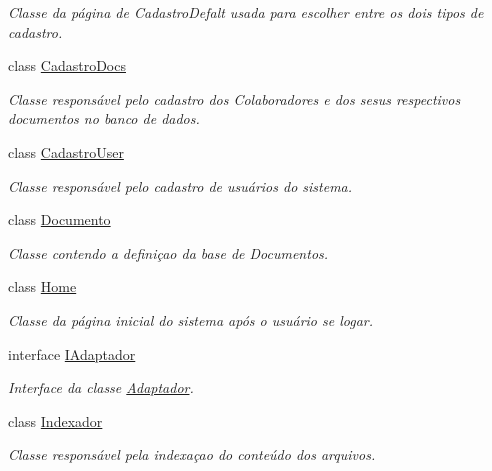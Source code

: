 \begin{DoxyCompactItemize}
\begin{DoxyCompactList}\small\item\em Classe da página de CadastroDefalt usada para escolher entre os dois tipos de cadastro. \item\end{DoxyCompactList}\item 
class \hyperlink{class_sistema_r_h_1_1_cadastro_docs}{CadastroDocs}
\begin{DoxyCompactList}\small\item\em Classe responsável pelo cadastro dos Colaboradores e dos sesus respectivos documentos no banco de dados. \item\end{DoxyCompactList}\item 
class \hyperlink{class_sistema_r_h_1_1_cadastro_user}{CadastroUser}
\begin{DoxyCompactList}\small\item\em Classe responsável pelo cadastro de usuários do sistema. \item\end{DoxyCompactList}\item 
class \hyperlink{class_sistema_r_h_1_1_documento}{Documento}
\begin{DoxyCompactList}\small\item\em Classe contendo a definiçao da base de Documentos. \item\end{DoxyCompactList}\item 
class \hyperlink{class_sistema_r_h_1_1_home}{Home}
\begin{DoxyCompactList}\small\item\em Classe da página inicial do sistema após o usuário se logar. \item\end{DoxyCompactList}\item 
interface \hyperlink{interface_sistema_r_h_1_1_i_adaptador}{IAdaptador}
\begin{DoxyCompactList}\small\item\em Interface da classe \hyperlink{class_sistema_r_h_1_1_adaptador}{Adaptador}. \item\end{DoxyCompactList}\item 
class \hyperlink{class_sistema_r_h_1_1_indexador}{Indexador}
\begin{DoxyCompactList}\small\item\em Classe responsável pela indexaçao do conteúdo dos arquivos. \item\end{DoxyCompactList}\item 

\end{DoxyCompactItemize}

